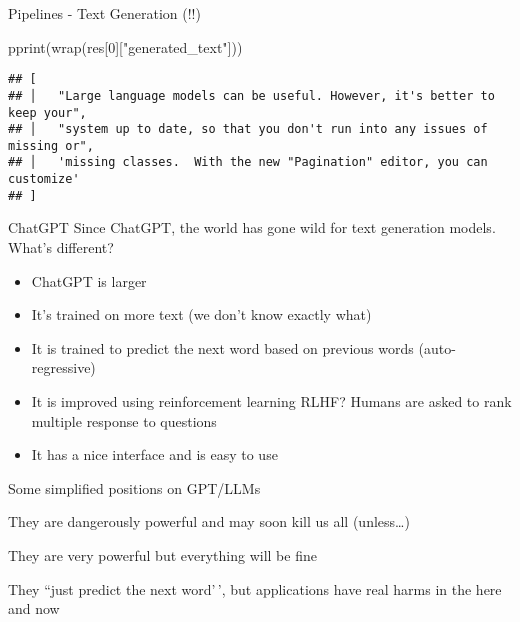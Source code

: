 \documentclass[
  10pt,
  ignorenonframetext,
  aspectratio=169]{beamer}
\newenvironment{Shaded}{\begin{snugshade}}{\end{snugshade}}
\newcommand{\DecValTok}[1]{\textcolor[rgb]{0.86,0.86,0.80}{#1}}
\newcommand{\NormalTok}[1]{\textcolor[rgb]{0.80,0.80,0.80}{#1}}
\newcommand{\StringTok}[1]{\textcolor[rgb]{0.80,0.58,0.58}{#1}}
\begin{document}
\begin{frame}[fragile]{Pipelines - Text Generation (!!)}
\begin{Shaded}
\begin{Highlighting}[]
\NormalTok{pprint(wrap(res[}\DecValTok{0}\NormalTok{][}\StringTok{"generated\_text"}\NormalTok{]))}
\end{Highlighting}
\end{Shaded}

\begin{verbatim}
## [
## │   "Large language models can be useful. However, it's better to keep your",
## │   "system up to date, so that you don't run into any issues of missing or",
## │   'missing classes.  With the new "Pagination" editor, you can customize'
## ]
\end{verbatim}
\end{frame}

\begin{frame}{ChatGPT}
\protect\hypertarget{chatgpt}{}
Since ChatGPT, the world has gone wild for text generation models.
What's different?

\begin{itemize}
  \item<1->ChatGPT is larger
  \item<2->It's trained on more text (we don't know exactly what)
  \item<3->It is trained to predict the next word based on previous words (auto-regressive)
  \item<4->It is improved using reinforcement learning RLHF? Humans are asked to rank multiple response to questions
  \item<5->It has a nice interface and is easy to use
\end{itemize}
\end{frame}

\begin{frame}{Some simplified positions on GPT/LLMs}
\protect\hypertarget{some-simplified-positions-on-gptllms}{}
\begin{block}{They are dangerously powerful and may soon kill us all
(unless\ldots)}
\protect\hypertarget{they-are-dangerously-powerful-and-may-soon-kill-us-all-unless}{}
\end{block}

\begin{block}{They are very powerful but everything will be fine}
\protect\hypertarget{they-are-very-powerful-but-everything-will-be-fine}{}
\end{block}

\begin{block}{They ``just predict the next word'\,', but applications
have real harms in the here and now}
\protect\hypertarget{they-just-predict-the-next-word-but-applications-have-real-harms-in-the-here-and-now}{}
\end{block}
\end{frame}
\end{document}
